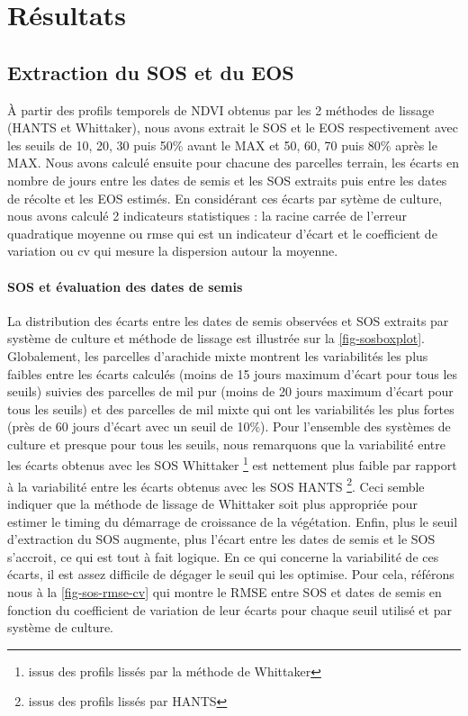 \section{Résultats}

\subsection{Extraction du SOS et du EOS}

\`A partir des profils temporels de NDVI obtenus par les 2 méthodes de lissage (HANTS et Whittaker), nous avons extrait le SOS et le EOS respectivement avec les seuils de 10, 20, 30 puis 50\% avant le MAX et 50, 60, 70 puis 80\% après le MAX. Nous avons calculé ensuite pour chacune des parcelles terrain, les écarts en nombre de jours entre les dates de semis et les SOS extraits puis entre les dates de récolte et les EOS estimés. En considérant ces écarts par sytème de culture, nous avons calculé 2 indicateurs statistiques : la racine carrée de l'erreur quadratique moyenne ou \acrshort{rmse} qui est un indicateur d'écart et le coefficient de variation ou \acrshort{cv} qui mesure la dispersion autour la moyenne. 

\paragraph{SOS et évaluation des dates de semis}

La distribution des écarts entre les dates de semis observées et SOS extraits par système de culture et méthode de lissage est illustrée sur la \cref{fig-sosboxplot}. Globalement, les parcelles d'arachide mixte montrent les variabilités les plus faibles entre les écarts calculés (moins de 15 jours maximum d'écart pour tous les seuils) suivies des parcelles de mil pur (moins de 20 jours maximum d'écart pour tous les seuils) et des parcelles de mil mixte qui ont les variabilités les plus fortes (près de 60 jours d'écart avec un seuil de 10\%). Pour l'ensemble des systèmes de culture et presque pour tous les seuils, nous remarquons que la variabilité entre les écarts obtenus avec les SOS Whittaker \footnote{issus des profils lissés par la méthode de Whittaker} est nettement plus faible par rapport à la variabilité entre les écarts obtenus avec les SOS HANTS \footnote{issus des profils lissés par HANTS}. Ceci semble indiquer que la méthode de lissage de Whittaker soit plus appropriée pour estimer le timing du démarrage de croissance de la végétation. Enfin, plus le seuil d'extraction du SOS augmente, plus l'écart entre les dates de semis et le SOS s'accroit, ce qui est tout à fait logique. En ce qui concerne la variabilité de ces écarts, il est assez difficile de dégager le seuil qui les optimise. Pour cela, référons nous à la \cref{fig-sos-rmse-cv} qui montre le RMSE entre SOS et dates de semis en fonction du coefficient de variation de leur écarts pour chaque seuil utilisé et par système de culture. 

